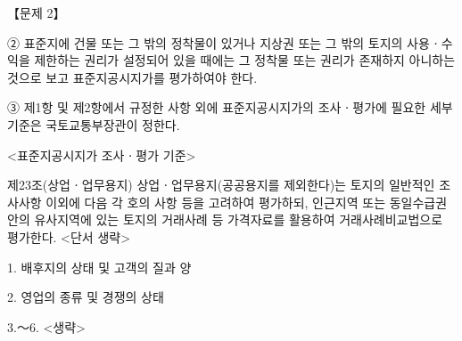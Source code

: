 \begin{longquestion}{【문제 2】}
\begin{framedtext}
② 표준지에 건물 또는 그 밖의 정착물이 있거나 지상권 또는 그 밖의 토지의 사용ㆍ수익을 제한하는 권리가 설정되어 있을 때에는 그 정착물 또는 권리가 존재하지 아니하는 것으로 보고 표준지공시지가를 평가하여야 한다. \par
③ 제1항 및 제2항에서 규정한 사항 외에 표준지공시지가의 조사ㆍ평가에 필요한 세부기준은 국토교통부장관이 정한다. \par
<표준지공시지가 조사ㆍ평가 기준> \par
제23조(상업ㆍ업무용지) 상업ㆍ업무용지(공공용지를 제외한다)는 토지의 일반적인 조사사항 이외에 다음 각 호의 사항 등을 고려하여 평가하되, 인근지역 또는 동일수급권 안의 유사지역에 있는 토지의 거래사례 등 가격자료를 활용하여 거래사례비교법으로 평가한다. <단서 생략> \par
1. 배후지의 상태 및 고객의 질과 양 \par
2. 영업의 종류 및 경쟁의 상태 \par
3.～6. <생략> \par
\end{framedtext}
\end{longquestion}
